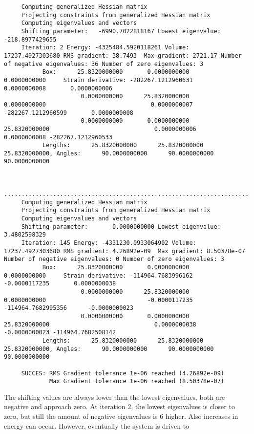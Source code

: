 \begin{tiny}
\begin{verbatim}
     Computing generalized Hessian matrix
     Projecting constraints from generalized Hessian matrix
     Computing eigenvalues and vectors
     Shifting parameter:   -6990.7022818167 Lowest eigenvalue:    -218.8977429655
     Iteration: 2 Energy: -4325484.5920118261 Volume:   17237.4927303680 RMS gradient: 38.7493  Max gradient: 2721.17 Number of negative eigenvalues: 36 Number of zero eigenvalues: 3
           Box:      25.8320000000       0.0000000000       0.0000000000     Strain derivative: -282267.1212960631       0.0000000008       0.0000000006
                      0.0000000000      25.8320000000       0.0000000000                              0.0000000007 -282267.1212960599       0.0000000008
                      0.0000000000       0.0000000000      25.8320000000                              0.0000000006       0.0000000008 -282267.1212960533
           Lengths:      25.8320000000      25.8320000000      25.8320000000, Angles:      90.0000000000      90.0000000000      90.0000000000


     ..........................................................................
     Computing generalized Hessian matrix
     Projecting constraints from generalized Hessian matrix
     Computing eigenvalues and vectors
     Shifting parameter:      -0.0000000000 Lowest eigenvalue:       3.4802598329
     Iteration: 145 Energy: -4331230.0933064902 Volume:   17237.4927303680 RMS gradient: 4.26892e-09  Max gradient: 8.50378e-07 Number of negative eigenvalues: 0 Number of zero eigenvalues: 3
           Box:      25.8320000000       0.0000000000       0.0000000000     Strain derivative: -114964.7683996162      -0.0000117235       0.0000000038
                      0.0000000000      25.8320000000       0.0000000000                             -0.0000117235 -114964.7682995356      -0.0000000023
                      0.0000000000       0.0000000000      25.8320000000                              0.0000000038      -0.0000000023 -114964.7682508142
           Lengths:      25.8320000000      25.8320000000      25.8320000000, Angles:      90.0000000000      90.0000000000      90.0000000000

     SUCCES: RMS Gradient tolerance 1e-06 reached (4.26892e-09)
             Max Gradient tolerance 1e-06 reached (8.50378e-07)
\end{verbatim}
\end{tiny}
The shifting values are always lower than the lowest eigenvalues, both are negative and approach zero. At iteration 2, the lowest eigenvalues is closer
to zero, but still the amount of negative eigenvalues is 6 higher. Also increases in energy can occur. However, eventually the system is driven to
